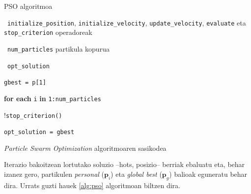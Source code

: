 \documentclass[eu]{ifirak}\usepackage[]{graphicx}\usepackage[]{color}
\newcommand{\eng}[1]{\textit{#1}}
\begin{document}
\begin{ifalgorithm}[t]\label{alg:pso}
\begin{ifpseudo}{PSO algoritmoa}
\item \In\ \texttt{initialize\_position}, \texttt{initialize\_velocity}, \texttt{update\_velocity}, \texttt{evaluate} eta \texttt{stop\_criterion} operadoreak
\item \In\ \texttt{num\_particles} partikula kopurua
\item \Out\ \texttt{opt\_solution}
\item \texttt{gbest = p[1]}
\item \textbf{for each} \texttt{i} \textbf{in} \texttt{1:num\_particles} \Do
\item {}
\item {}
\item {}
\item {}
\item {}
\item \T{\EIf}
\item \Done
\item \While !\texttt{stop\_criterion()} \Do
\item {}
\item \T{\Do}
\item {}
\item {}
\item {}
\item {}
\item \TT{\EIf}
\item {}
\item {}
\item \TT{\EIf}
\item \T{\Done}
\item \Done
\item \texttt{opt\_solution = gbest}
\end{ifpseudo}
\caption{\textit{Particle Swarm Optimization} algoritmoaren sasikodea}
\end{ifalgorithm}


Iterazio bakoitzean lortutako soluzio --hots, posizio-- berriak ebaluatu eta, behar izanez gero, partikulen \eng{personal} ($\mathbf{p}_i$) eta \eng{global best} ($\mathbf{p}_g$) balioak eguneratu behar dira. Urrats guzti hauek \ref{alg:pso} algoritmoan biltzen dira.
\end{document}
